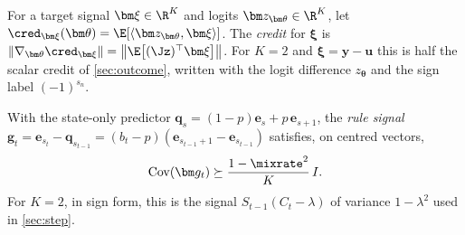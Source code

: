 \begin{definition}[Credit]
\label{def:credit}
For a target signal $\bm\xi\in\R^K$ and logits $\bm z_{\bm\theta}\in\R^K$, let $\cred_{\bm\xi}(\bm\theta)=\E[\langle\bm z_{\bm\theta},\bm\xi\rangle]$.
The \emph{credit} for $\bm\xi$ is $\|\nabla_{\bm\theta}\cred_{\bm\xi}\|=\bigl\|\E\bigl[(\Jz)^\top\bm\xi\bigr]\bigr\|$.
For $K=2$ and $\bm\xi=\bm y-\bm u$ this is half the scalar credit of \cref{sec:outcome}, written with the logit
difference $z_{\bm\theta}$ and the sign label $(-1)^{s_n}$.
\end{definition}

With the state-only predictor $\bm q_s=(1-p)\bm e_s+p\,\bm e_{s+1}$, the \emph{rule signal}
$\bm g_t=\bm e_{s_t}-\bm q_{s_{t-1}}=(b_t-p)(\bm e_{s_{t-1}+1}-\bm e_{s_{t-1}})$ satisfies, on centred vectors,
\begin{equation}
 \operatorname{Cov}(\bm g_t)\succeq\frac{1-\mixrate^2}{K}\,I .
 \label{eq:local-variation}
\end{equation}
For $K=2$, in sign form, this is the signal $S_{t-1}(C_t-\lambda)$ of variance $1-\lambda^2$ used in \cref{sec:step}.

